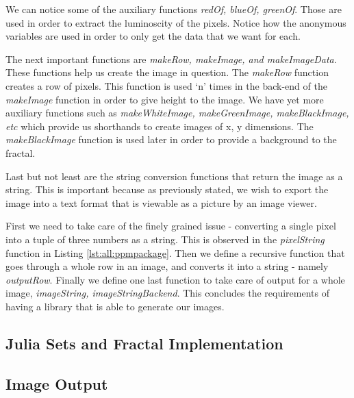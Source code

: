 We can notice some of the auxiliary functions \textit{redOf, blueOf, greenOf}. 
Those are used in order to extract the luminoscity of the pixels. Notice how
the anonymous variables are used in order to only get the data that we want for
each. 

The next important functions are \textit{makeRow, makeImage, and
makeImageData}. These functions help us create the image in question. The
\textit{makeRow} function creates a row of pixels. This function is used `n'
times in the back-end of the \textit{makeImage} function in order to give
height to the image. We have yet more auxiliary functions such as
\textit{makeWhiteImage, makeGreenImage, makeBlackImage, etc} which provide us
shorthands to create images of x, y dimensions. The \textit{makeBlackImage} 
function is used later in order to provide a background to the fractal. 

Last but not least are the string conversion functions that return the image
as a string. This is important because as previously stated, we wish to export
the image into a text format that is viewable as a picture by an image viewer.

First we need to take care of the finely grained issue - converting a single 
pixel into a tuple of three numbers as a string. This is observed in the
\textit{pixelString} function in Listing \ref{lst:all:ppmpackage}. Then we 
define a recursive function that goes through a whole row in an image, and 
converts it into a string - namely \textit{outputRow}. Finally we define one
last function to take care of output for a whole image, \textit{imageString, 
imageStringBackend}. This concludes the requirements of having a library that
is able to generate our images.

\subsection{Julia Sets and Fractal Implementation}

\subsection{Image Output}


